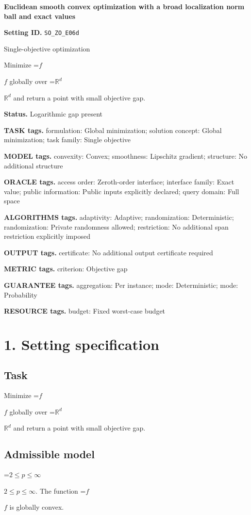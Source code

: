 \documentclass[10pt,a4paper]{article}
\newcommand{\AtlasMath}[1]{\par\begingroup\centering\setbox0=\hbox{$\displaystyle #1$}\ifdim\wd0>1.4\linewidth\typeout{ATLAS WIDE FORMULA: \the\wd0}\fi\ifdim\wd0>\linewidth\resizebox{\linewidth}{!}{\box0}\else\box0\fi\par\endgroup}
\newcommand{\AtlasInlineMath}[1]{\begingroup\setbox0=\hbox{$#1$}\ifdim\wd0>.4\linewidth\endgroup\AtlasMath{#1}\else\endgroup$#1$\fi}
\begin{document}
\raggedright

{\LARGE\bfseries\sffamily\color{AtlasNavy} Euclidean smooth convex optimization with a broad localization norm ball and exact values\par}\vspace{5pt}
\textbf{Setting ID.} \texttt{SO\_\allowbreak{}ZO\_\allowbreak{}E06d}

Single-objective optimization

Minimize \AtlasInlineMath{f} globally over \AtlasInlineMath{\mathbb{R}^d} and return a point with small objective gap.

\textbf{Status.} Logarithmic gap present

\textbf{TASK tags.} formulation: Global minimization; solution concept: Global minimization; task family: Single objective

\textbf{MODEL tags.} convexity: Convex; smoothness: Lipschitz gradient; structure: No additional structure

\textbf{ORACLE tags.} access order: Zeroth-order interface; interface family: Exact value; public information: Public inputs explicitly declared; query domain: Full space

\textbf{ALGORITHMS tags.} adaptivity: Adaptive; randomization: Deterministic; randomization: Private randomness allowed; restriction: No additional span restriction explicitly imposed

\textbf{OUTPUT tags.} certificate: No additional output certificate required

\textbf{METRIC tags.} criterion: Objective gap

\textbf{GUARANTEE tags.} aggregation: Per instance; mode: Deterministic; mode: Probability

\textbf{RESOURCE tags.} budget: Fixed worst-case budget

\section{1. Setting specification}
\subsection{Task}
Minimize \AtlasInlineMath{f} globally over \AtlasInlineMath{\mathbb{R}^d} and return a point with small objective gap.

\subsection{Admissible model}
\AtlasInlineMath{2\le p\le\infty}. The function \AtlasInlineMath{f} is globally convex.
\end{document}
